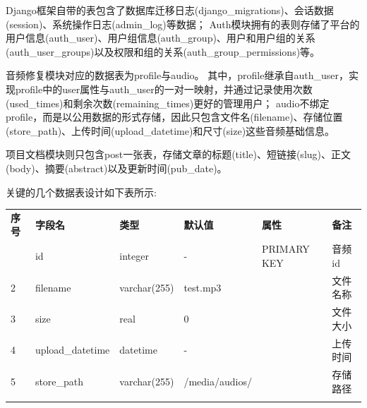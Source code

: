 \documentclass{morningstar}
\begin{document}
Django框架自带的表包含了数据库迁移日志(django\_migrations)、会话数据(session)、系统操作日志(admin\_log)等数据；
Auth模块拥有的表则存储了平台的用户信息(auth\_user)、用户组信息(auth\_group)、用户和用户组的关系(auth\_user\_groups)以及权限和组的关系(auth\_group\_permissions)等。

音频修复模块对应的数据表为profile与audio。
其中，profile继承自auth\_user，实现profile中的user属性与auth\_user的一对一映射，并通过记录使用次数(used\_times)和剩余次数(remaining\_times)更好的管理用户；
audio不绑定profile，而是以公用数据的形式存储，因此只包含文件名(filename)、存储位置(store\_path)、上传时间(upload\_datetime)和尺寸(size)这些音频基础信息。

项目文档模块则只包含post一张表，存储文章的标题(title)、短链接(slug)、正文(body)、摘要(abstract)以及更新时间(pub\_date)。

关键的几个数据表设计如下表所示: 


\begin{table}[ht]
    \centering
    \begin{tabular}{p{1cm}p{2.5cm}p{2cm}p{2.5cm}p{3cm}p{2.3cm}}
    \thickhline
    \textbf{序号} & \textbf{字段名}         & \textbf{类型} & \textbf{默认值} & \textbf{属性}          & \textbf{备注} \\
    \thickhline
    1            & id                     & integer      & -              & PRIMARY KEY & 音频 id       \\
    2            & filename               & varchar(255) & test.mp3       &             & 文件名称        \\
    3            & size                   & real         & 0              &             & 文件大小        \\
    4            & upload\_datetime       & datetime     & -              &             & 上传时间        \\
    5            & store\_path            & varchar(255) & /media/audios/ &             & 存储路径        \\
    \thickhline
    \end{tabular}
\end{table}
\end{document}
